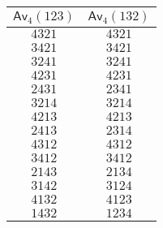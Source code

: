 
    \begin{tabular}{c|c}
        $\textsf{Av}_4(123)$ & $\textsf{Av}_4(132)$\\
        \hline
        $4321$ & $4321$\\
        $3421$ & $3421$\\
        $3241$ & $3241$\\
        $4231$ & $4231$\\
        $2431$ & $2341$\\
        $3214$ & $3214$\\
        $4213$ & $4213$\\
        $2413$ & $2314$\\
        $4312$ & $4312$\\
        $3412$ & $3412$\\
        $2143$ & $2134$\\
        $3142$ & $3124$\\
        $4132$ & $4123$\\
        $1432$ & $1234$\\
    \end{tabular}